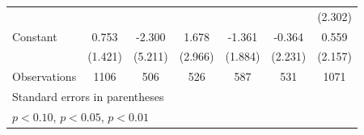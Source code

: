 \begin{table}[htbp]
\begin{tabular}{l*{6}{c}}
                    &                     &                     &                     &                     &                     &     (2.302)         \\
\addlinespace
Constant            &       0.753         &      -2.300         &       1.678         &      -1.361         &      -0.364         &       0.559         \\
                    &     (1.421)         &     (5.211)         &     (2.966)         &     (1.884)         &     (2.231)         &     (2.157)         \\
\midrule
Observations        &        1106         &         506         &         526         &         587         &         531         &        1071         \\
\bottomrule
\multicolumn{7}{l}{\footnotesize Standard errors in parentheses}\\
\multicolumn{7}{l}{\footnotesize \sym{*} \(p<0.10\), \sym{**} \(p<0.05\), \sym{***} \(p<0.01\)}\\
\end{tabular}
\end{table}
